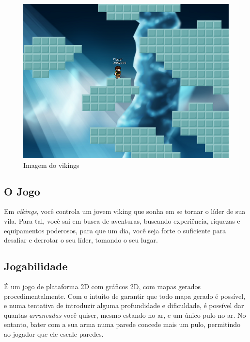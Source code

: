   \begin{figure}
    \includegraphics{imagens/vikings-1.png}
    \caption{Imagem do vikings}
  \end{figure}
  
  \addtocounter{footnote}{-3}


  \subsection{O Jogo}
    Em \textit{vikings}, você controla um jovem viking que sonha em se tornar o líder de sua vila. Para tal,
    você sai em busca de aventuras, buscando experiência, riquezas e equipamentos poderosos, para que um dia,
    você seja forte o suficiente para desafiar e derrotar o seu líder, tomando o seu lugar.
        
  \subsection{Jogabilidade}
    É um jogo de plataforma 2D com gráficos 2D, com mapas gerados procedimentalmente. Com o intuito de garantir
    que todo mapa gerado é possível, e numa tentativa de introduzir alguma profundidade e dificuldade, é
    possível dar quantas \textit{arrancadas} você quiser, mesmo estando no ar, e um único pulo no ar. No
    entanto, bater com a sua arma numa parede concede mais um pulo, permitindo ao jogador que ele escale
    paredes.
    

